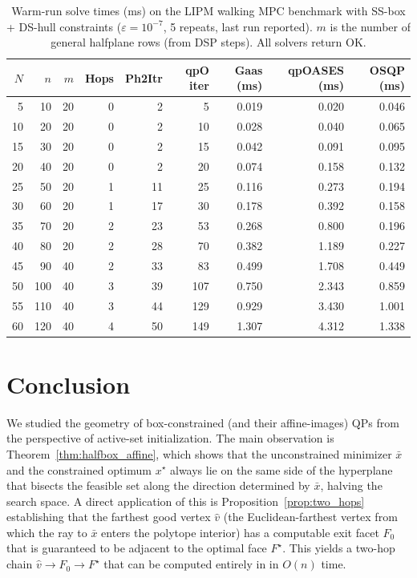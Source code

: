 \documentclass[pdflatex,sn-mathphys-num]{sn-jnl}%
\theoremstyle{thmstyleone}%
\theoremstyle{thmstyletwo}%
\theoremstyle{thmstylethree}%
\theoremstyle{thmstylethree}%
\begin{document}
\begin{table}[h]
\centering
\caption{Warm-run solve times (ms) on the LIPM walking MPC benchmark with
SS-box + DS-hull constraints ($\varepsilon=10^{-7}$, 5 repeats, last run reported).
$m$ is the number of general halfplane rows (from DSP steps). All solvers return OK.}
\label{tab:lipm}
\smallskip
\begin{tabular}{rrrrrrrrr}
\hline
$N$ & $n$ & $m$ & Hops & Ph2Itr & qpO iter & Gaas (ms) & qpOASES (ms) & OSQP (ms) \\
\hline
  5 &  10 & 20 &  0 &   2 &   5 & 0.019 & 0.020 & 0.046 \\
 10 &  20 & 20 &  0 &   2 &  10 & 0.028 & 0.040 & 0.065 \\
 15 &  30 & 20 &  0 &   2 &  15 & 0.042 & 0.091 & 0.095 \\
 20 &  40 & 20 &  0 &   2 &  20 & 0.074 & 0.158 & 0.132 \\
 25 &  50 & 20 &  1 &  11 &  25 & 0.116 & 0.273 & 0.194 \\
 30 &  60 & 20 &  1 &  17 &  30 & 0.178 & 0.392 & 0.158 \\
 35 &  70 & 20 &  2 &  23 &  53 & 0.268 & 0.800 & 0.196 \\
 40 &  80 & 20 &  2 &  28 &  70 & 0.382 & 1.189 & 0.227 \\
 45 &  90 & 40 &  2 &  33 &  83 & 0.499 & 1.708 & 0.449 \\
 50 & 100 & 40 &  3 &  39 & 107 & 0.750 & 2.343 & 0.859 \\
 55 & 110 & 40 &  3 &  44 & 129 & 0.929 & 3.430 & 1.001 \\
 60 & 120 & 40 &  4 &  50 & 149 & 1.307 & 4.312 & 1.338 \\
\hline
\end{tabular}
\end{table}


\section{Conclusion}\label{sec:conc}

We studied the geometry of box-constrained (and their affine-images) QPs from the perspective of active-set initialization.
The main observation is Theorem~\ref{thm:halfbox_affine}, which shows that the unconstrained minimizer
$\bar{x}$ and the constrained optimum $x^\star$ always lie on the same side of the hyperplane that bisects
the feasible set along the direction determined by $\bar{x}$, halving the search space.
A direct application of this is Proposition~\ref{prop:two_hops} establishing that the farthest good vertex $\hat{v}$
(the Euclidean-farthest vertex from which the ray to $\bar{x}$ enters the polytope interior) has a
computable exit facet $F_0$ that is guaranteed to be adjacent to the optimal face $F^\star$.
This yields a two-hop chain $\hat{v}\to F_0\to F^\star$ that can be computed entirely in 
in $O(n)$ time.
\end{document}
